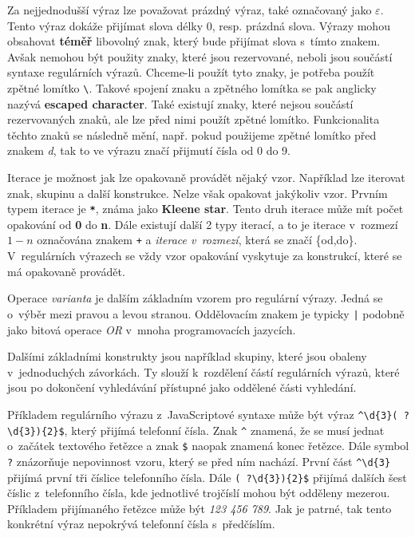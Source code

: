 Za nejjednodušší výraz lze považovat prázdný výraz, také označovaný jako $\varepsilon$. 
Tento výraz dokáže přijímat slova délky 0, resp. prázdná slova.
Výrazy mohou obsahovat \textbf{téměř} libovolný znak, který bude přijímat slova s~tímto znakem. 
Avšak nemohou být použity znaky, které jsou rezervované, neboli jsou součástí syntaxe regulárních výrazů.
Chceme-li použít tyto znaky, je potřeba použít zpětné lomítko \texttt{\textbackslash}. 
Takové spojení znaku a zpětného lomítka se pak anglicky nazývá \textbf{escaped character}.
Také existují znaky, které nejsou součástí rezervovaných znaků, ale lze před nimi použít zpětné lomítko.
Funkcionalita těchto znaků se následně mění, např. pokud použijeme zpětné lomítko před znakem \textit{d}, tak to ve výrazu značí přijmutí čísla od 0 do 9.

Iterace je možnost jak lze opakovaně provádět nějaký vzor.
Například lze iterovat znak, skupinu a další konstrukce. 
Nelze však opakovat jakýkoliv vzor.
Prvním typem iterace je \texttt{\textbf{*}}, známa jako \textbf{Kleene star}.
Tento druh iterace může mít počet opakování od \textbf{0} do \textbf{n}. 
Dále existují další 2 typy iterací, a to je iterace v~rozmezí $1-n$ označována znakem \texttt{+} a \textit{iterace v~rozmezí}, která se značí \{od,do\}.
V~regulárních výrazech se vždy vzor opakování vyskytuje za konstrukcí, které se má opakovaně provádět.

Operace \textit{varianta} je dalším základním vzorem pro regulární výrazy. 
Jedná se o~výběr mezi pravou a levou stranou. 
Oddělovacím znakem je typicky \texttt{|} podobně jako bitová operace \textit{OR} v~mnoha programovacích jazycích.

Dalšími základními konstrukty jsou například skupiny, které jsou obaleny v~jednoduchých závorkách.
Ty slouží k~rozdělení částí regulárních výrazů, které jsou po dokončení vyhledávání přístupné jako oddělené části vyhledání.

Příkladem regulárního výrazu z~JavaScriptové syntaxe může být výraz \texttt{\textasciicircum \textbackslash d\{3\}(~?\textbackslash d\{3\})\{2\}\$}, který přijímá telefonní čísla.
Znak \texttt{\textasciicircum} znamená, že se musí jednat o~začátek textového řetězce a znak \texttt{\$} naopak znamená konec řetězce.
Dále symbol \texttt{?} znázorňuje nepovinnost vzoru, který se před ním nachází.
První část \texttt{\textasciicircum \textbackslash d\{3\}} přijímá první tři číslice telefonního čísla.
Dále \texttt{(~?\textbackslash d\{3\})\{2\}\$} přijímá dalších šest číslic z~telefonního čísla, kde jednotlivé trojčíslí mohou být odděleny mezerou.
Příkladem přijímaného řetězce může být \textit{123 456 789}.
Jak je patrné, tak tento konkrétní výraz nepokrývá telefonní čísla s~předčíslím.

